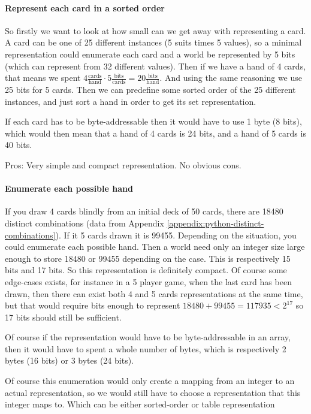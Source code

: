 \paragraph{Represent each card in a sorted order}
So firstly we want to look at how small can we get away with representing a card. A card can be one of 25 different instances (5 suits times 5 values), so a minimal representation could enumerate each card and a world be represented by 5 bits (which can represent from 32 different values).
Then if we have a hand of 4 cards, that means we spent $4 \frac{\text{cards}}{\text{hand}} \cdot 5 \frac{\text{bits}}{\text{cards}} = 20 \frac{\text{bits}}{\text{hand}}$. And using the same reasoning we use 25 bits for 5 cards.
Then we can predefine some sorted order of the 25 different instances, and just sort a hand in order to get its set representation.

If each card has to be byte-addressable then it would have to use 1 byte (8 bits), which would then mean that a hand of 4 cards is 24 bits, and a hand of 5 cards is 40 bits.

Pros: Very simple and compact representation. No obvious cons.

\paragraph{Enumerate each possible hand}
If you draw 4 cards blindly from an initial deck of 50 cards, there are 18480 distinct combinations (data from Appendix \ref{appendix:python-distinct-combinations}). If it 5 cards drawn it is 99455. 
Depending on the situation, you could enumerate each possible hand. Then a world need only an integer size large enough to store 18480 or 99455 depending on the case. This is respectively 15 bits and 17 bits.
So this representation is definitely compact. Of course some edge-cases exists, for instance in a 5 player game, when the last card has been drawn, then there can exist both 4 and 5 cards representations at the same time, but that would require bits enough to represent $18480+99455 = 117935 < 2^{17}$ so 17 bits should still be sufficient.

Of course if the representation would have to be byte-addressable in an array, then it would have to spent a whole number of bytes, which is respectively 2 bytes (16 bits) or 3 bytes (24 bits).

Of course this enumeration would only create a mapping from an integer to an actual representation, so we would still have to choose a representation that this integer maps to. Which can be either sorted-order or table representation

